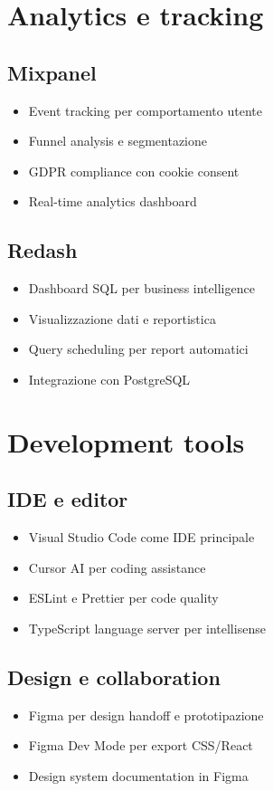 \section{Analytics e tracking}
\subsection{Mixpanel}
\begin{itemize}
  \item Event tracking per comportamento utente
  \item Funnel analysis e segmentazione
  \item GDPR compliance con cookie consent
  \item Real-time analytics dashboard
\end{itemize}

\subsection{Redash}
\begin{itemize}
  \item Dashboard SQL per business intelligence
  \item Visualizzazione dati e reportistica
  \item Query scheduling per report automatici
  \item Integrazione con PostgreSQL
\end{itemize}

\section{Development tools}
\subsection{IDE e editor}
\begin{itemize}
  \item Visual Studio Code come IDE principale
  \item Cursor AI per coding assistance
  \item ESLint e Prettier per code quality
  \item TypeScript language server per intellisense
\end{itemize}

\subsection{Design e collaboration}
\begin{itemize}
  \item Figma per design handoff e prototipazione
  \item Figma Dev Mode per export CSS/React
  \item Design system documentation in Figma
\end{itemize}

